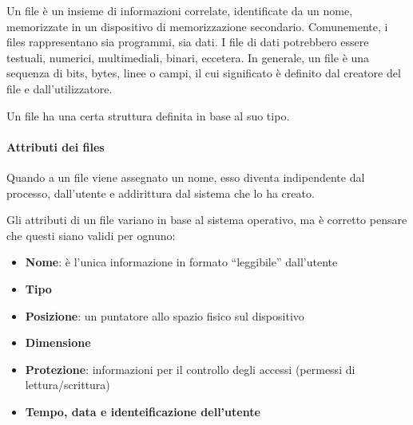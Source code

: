 \documentclass[a4paper]{article}
\begin{document}
Un file è un insieme di informazioni correlate, identificate da un nome, memorizzate in un dispositivo di memorizzazione secondario. Comunemente, i files rappresentano sia programmi, sia dati. I file di dati potrebbero essere testuali, numerici, multimediali, binari, eccetera. In generale, un file è una sequenza di bits, bytes, linee o campi, il cui significato è definito dal creatore del file e dall'utilizzatore.

Un file ha una certa struttura definita in base al suo tipo.

\paragraph{Attributi dei files}
Quando a un file viene assegnato un nome, esso diventa indipendente dal processo, dall'utente e addirittura dal sistema che lo ha creato.

Gli attributi di un file variano in base al sistema operativo, ma è corretto pensare che questi siano validi per ognuno:
\begin{itemize}
   \item \textbf{Nome}: è l'unica informazione in formato ``leggibile'' dall'utente
   \item \textbf{Tipo}
   \item \textbf{Posizione}: un puntatore allo spazio fisico sul dispositivo
   \item \textbf{Dimensione}
   \item \textbf{Protezione}: informazioni per il controllo degli accessi (permessi di lettura/scrittura)
   \item \textbf{Tempo, data e identeificazione dell'utente}
\end{itemize}
\end{document}
